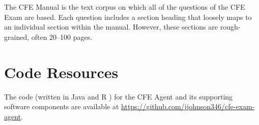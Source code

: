The CFE Manual is the text corpus on which all of the questions of the CFE Exam are based.  Each question includes a section heading that loosely maps to an individual section within the manual.  However, these sections are rough-grained, often 20--100 pages.  

\section{Code Resources}

The code (written in Java \cite{java_software} and R \cite{r_software}) for the CFE Agent and its supporting software components are available at \url{https://github.com/jjohnson346/cfe-exam-agent}.








